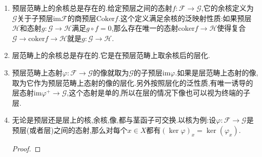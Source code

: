 \begin{enumerate}
\begin{enumerate}[(a)]
\begin{enumerate}[(1)]
\begin{proof}
				验证粘合性公理,即对开集$U$,和$U$的任意开覆盖$\{V_i,i\in I\}$,对每个$i\in I$取了一个元$x_i\in K(V_i)$,满足如果$i,j\in I$,就有$x_i\mid_{V_i\cap V_j}=x_j\mid_{V_i\cap V_j}$,需要验证的是存在元$x\in K(U)$使得$x\mid_{V_i}=x_i$.但是同样的按照$K(U)$实际上是$\mathscr{F}(U)$的子集,从$\mathscr{F}$上的粘合性公理得到存在$x\in \mathscr{F}(U)$满足$x\mid_{V_i}=x_i$.最后仅需要验证$x\in K(U)$中.这是因为$x'=\mathscr{F}(U)(x)$满足$\mathrm{res}_{U,V_i}(x')=\mathscr{F}(V_i)(x_i)=0$,于是从$\mathscr{G}$上的唯一性公理得到$x'=0$,也即$x\in K(U)$.
			\end{proof}
			\item 预层范畴上的余核总是存在的.给定预层之间的态射$f:\mathscr{F}\to\mathscr{G}$,它的余核定义为$\mathscr{G}$关于子预层$\mathrm{im}\mathscr{F}$的商预层$\mathrm{Coker}f$.这个定义满足余核的泛映射性质:如果预层$\mathscr{H}$和态射$g:\mathscr{G}\to\mathscr{H}$满足$g\circ f=0$,那么存在唯一的态射$\mathrm{coker}f\to\mathscr{H}$使得复合$\mathscr{G}\to\mathrm{coker}f\to\mathscr{H}$就是$g:\mathscr{G}\to\mathscr{H}$.
			\item 层范畴上的余核总是存在的.它是在预层范畴上取余核后的层化.
			\item 预层范畴上态射$\varphi:\mathscr{F}\to\mathscr{G}$的像就取为$\mathscr{G}$的子预层$\mathrm{im}\varphi$.如果是层范畴上态射的像,取为它作为预层范畴上态射的像的层化.另外按照层化的泛性质,有唯一诱导的层态射$\mathrm{im}\varphi^+\to\mathscr{G}$,这个态射是单的,所以在层的情况下像也可以视为终端的子层.
			\item 无论是预层还是层上的核,余核,像,都与茎函子可交换.以核为例:设$\varphi:\mathscr{F}\to\mathscr{G}$是预层(或者层)之间的态射,那么对每个$x\in X$都有$(\ker\varphi)_x=\ker(\varphi_x)$.
			\begin{proof}
				

\end{proof}
\end{enumerate}
\end{enumerate}
\end{enumerate}
